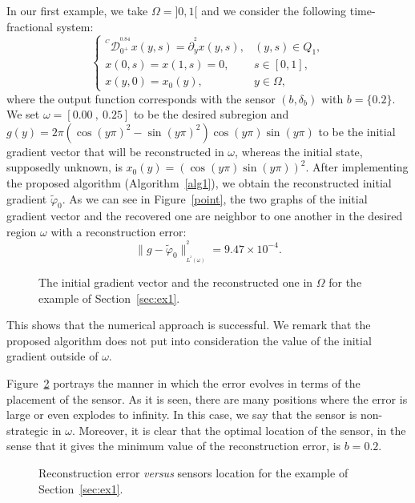\documentclass{article}
\begin{document}
In our first example, we take $\Omega = ]0,1[$ 
and we consider the following time-fractional system:
\begin{equation}
\label{sys.exp.1}
\left\{\begin{array}{llll}
^{^C}\mathcal{D}_{0^+}^{^{0.84}}x(y,s) 
=  \partial_y^{^2}x(y,s),  & (y,s)\in Q_1, \\ 
x(0,s)=x(1,s) = 0,  & s\in[0,1], \\
x(y,0) = x_0(y), & y\in\Omega,
\end{array}\right.
\end{equation}
where the output function corresponds with the sensor 
$(b,\delta_b)$ with $b= \{0.2\}$. We set $\omega = [0.00\ ,\ 0.25 ]$ 
to be the desired subregion and $g(y) = 2\pi\left(\cos(y\pi)^2 
- \sin(y\pi)^2\right)\cos(y\pi)\sin(y\pi)$ to be the initial 
gradient vector that will be reconstructed in $\omega$, whereas 
the initial state, supposedly unknown, is 
$x_0(y) = \left(\cos(y\pi)\sin(y\pi)\right)^2$. After implementing 
the proposed algorithm (Algorithm~\ref{alg1}), we obtain the 
reconstructed initial gradient $\tilde{\varphi}_0$. As we can see 
in Figure~\eqref{point}, the two graphs of the initial gradient 
vector and the recovered one are neighbor to one another 
in the desired region $\omega$ with a reconstruction error:
$$
\|g - \tilde{\varphi}_0 \|^{^2}_{_{L^{^2}(\omega)}} = 9.47\times10^{-4}.
$$
\begin{figure}
\caption{\label{point} The initial gradient vector 
and the reconstructed one in $\Omega$ for the example
of Section~\ref{sec:ex1}.}
\end{figure}
This shows that the numerical approach is successful. 
We remark that the proposed algorithm does not put 
into consideration the value of the initial gradient 
outside of $\omega$.
  
Figure~\ref{point.err} portrays the manner in which 
the error evolves in terms of the placement of the sensor. 
As it is seen, there are many positions where the error 
is large or even explodes to infinity. In this case, we say 
that the sensor is non-strategic in $\omega$. Moreover, it is 
clear that the optimal location of the sensor, in the sense 
that it gives the minimum value of the reconstruction error, 
is $b=0.2$. 
\begin{figure}
\caption{\label{point.err} Reconstruction error \emph{versus} 
sensors location for the example of Section~\ref{sec:ex1}.}
\end{figure}
\end{document}
